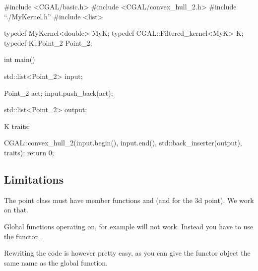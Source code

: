 \ccHtmlLinksOff
\begin{ccExampleCode}
#include <CGAL/basic.h>
#include <CGAL/convex_hull_2.h>
#include ``./MyKernel.h''
#include <list>

typedef MyKernel<double>           MyK;
typedef CGAL::Filtered_kernel<MyK> K;
typedef K::Point_2                 Point_2;

int main()
{
  std::list<Point_2> input;
  
  Point_2 act;
  input.push_back(act);

  std::list<Point_2> output;

  K  traits;

  CGAL::convex_hull_2(input.begin(), input.end(),
                      std::back_inserter(output), traits);		        
  return 0;
}
\end{ccExampleCode}

\ccHtmlLinksOn


\subsection{Limitations}

The point class must have member functions  and 
(and  for the 3d point). We work on that.

Global functions operating on, for example
 will not work. Instead you have to
use the functor .

Rewriting the code is however pretty easy, as you can give
the functor object the same name as the global function.
